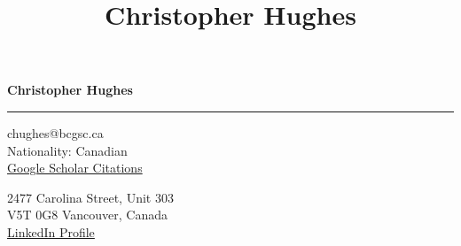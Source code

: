 \documentclass[11pt]{article}
\title{\bfseries\Huge Christopher Hughes}
\author{}
\date{}
\begin{document}
	\newpage
	\setcounter{page}{2}
	\noindent

\begin{LARGE}

	\noindent\textbf{Christopher Hughes}\vspace{1pt}

\end{LARGE}


\noindent\rule{\textwidth}{1pt}\vspace{9pt}

\noindent
\begin{minipage}{0.5\textwidth}
	\begin{flushleft}
		chughes@bcgsc.ca\\
		Nationality: Canadian\\ \href{https://scholar.google.com/citations?user=jPSwBGwAAAAJ}{Google Scholar Citations}
	\end{flushleft}
\end{minipage}%
\begin{minipage}{0.5\textwidth}
	\begin{flushright}
		2477 Carolina Street, Unit 303\\
		V5T 0G8 Vancouver, Canada\\ \href{https://www.linkedin.com/in/christopher-hughes-612460133/}{LinkedIn Profile}
	\end{flushright}
\end{minipage}\vspace{6pt}
\end{document}
